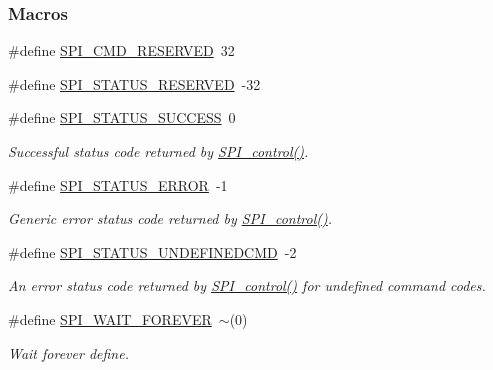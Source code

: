 \subsubsection*{Macros}
\begin{DoxyCompactItemize}
\item 
\#define \hyperlink{_s_p_i_8h_a3d23d16525ee76f77276472d8dea80b0}{S\+P\+I\+\_\+\+C\+M\+D\+\_\+\+R\+E\+S\+E\+R\+V\+E\+D}~32
\item 
\#define \hyperlink{_s_p_i_8h_ae1af8c6ebf5e8fe481649f65e37b1b9f}{S\+P\+I\+\_\+\+S\+T\+A\+T\+U\+S\+\_\+\+R\+E\+S\+E\+R\+V\+E\+D}~-\/32
\item 
\#define \hyperlink{_s_p_i_8h_ab38fa90ff62128dbc98b2ecd84ca106f}{S\+P\+I\+\_\+\+S\+T\+A\+T\+U\+S\+\_\+\+S\+U\+C\+C\+E\+S\+S}~0
\begin{DoxyCompactList}\small\item\em Successful status code returned by \hyperlink{_s_p_i_8h_ab9d3a23991be2741f382749d3844cc2f}{S\+P\+I\+\_\+control()}. \end{DoxyCompactList}\item 
\#define \hyperlink{_s_p_i_8h_a2d0020dd673cc28a9e1c20b0ff101073}{S\+P\+I\+\_\+\+S\+T\+A\+T\+U\+S\+\_\+\+E\+R\+R\+O\+R}~-\/1
\begin{DoxyCompactList}\small\item\em Generic error status code returned by \hyperlink{_s_p_i_8h_ab9d3a23991be2741f382749d3844cc2f}{S\+P\+I\+\_\+control()}. \end{DoxyCompactList}\item 
\#define \hyperlink{_s_p_i_8h_acfcd15e1eecdb99b4867adc7592a8d6e}{S\+P\+I\+\_\+\+S\+T\+A\+T\+U\+S\+\_\+\+U\+N\+D\+E\+F\+I\+N\+E\+D\+C\+M\+D}~-\/2
\begin{DoxyCompactList}\small\item\em An error status code returned by \hyperlink{_s_p_i_8h_ab9d3a23991be2741f382749d3844cc2f}{S\+P\+I\+\_\+control()} for undefined command codes. \end{DoxyCompactList}\item 
\#define \hyperlink{_s_p_i_8h_a7cab73b936e6e08392882196df41277e}{S\+P\+I\+\_\+\+W\+A\+I\+T\+\_\+\+F\+O\+R\+E\+V\+E\+R}~$\sim$(0)
\begin{DoxyCompactList}\small\item\em Wait forever define. \end{DoxyCompactList}\end{DoxyCompactItemize}
